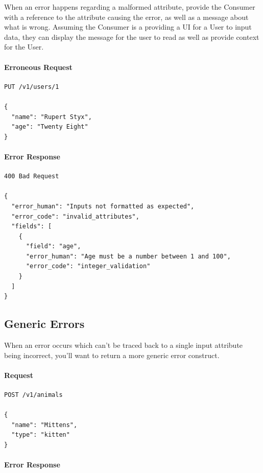\documentclass{book}
\begin{document}
When an error happens regarding a malformed attribute, provide the Consumer with a reference to the attribute causing the error, as well as a message about what is wrong. Assuming the Consumer is a providing a UI for a User to input data, they can display the message for the user to read as well as provide context for the User.

\paragraph{\textbf{Erroneous Request}}

\begin{verbatim}
PUT /v1/users/1

{
  "name": "Rupert Styx",
  "age": "Twenty Eight"
}
\end{verbatim}

\paragraph{\textbf{Error Response}}

\begin{verbatim}
400 Bad Request

{
  "error_human": "Inputs not formatted as expected",
  "error_code": "invalid_attributes",
  "fields": [
    {
      "field": "age",
      "error_human": "Age must be a number between 1 and 100",
      "error_code": "integer_validation"
    }
  ]
}
\end{verbatim}

\subsection{Generic Errors}

When an error occurs which can't be traced back to a single input attribute being incorrect, you'll want to return a more generic error construct.

\paragraph{\textbf{Request}}

\begin{verbatim}
POST /v1/animals

{
  "name": "Mittens",
  "type": "kitten"
}
\end{verbatim}

\paragraph{\textbf{Error Response}}
\end{document}
